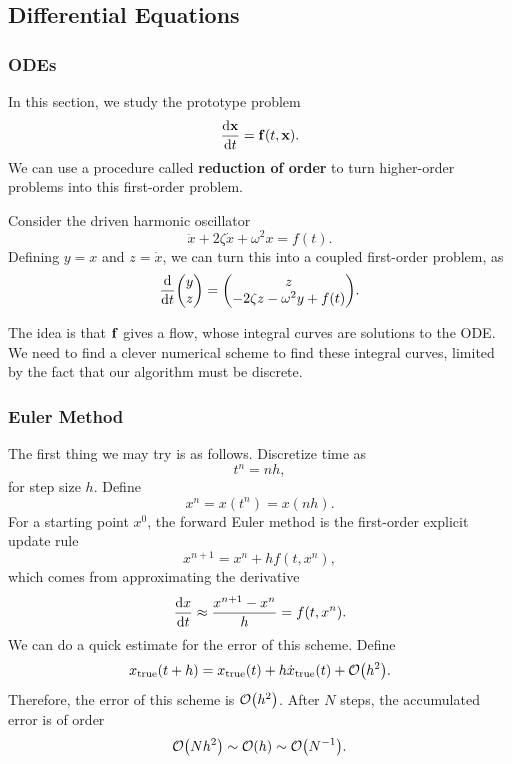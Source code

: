 \documentclass[12pt,letterpaper]{article}
\begin{document}
\subsection{Differential Equations}
\subsubsection{ODEs}
In this section, we study the prototype problem
\[\dv{\vb x}{t}=\vb f(t,\vb x).\]
We can use a procedure called \textbf{reduction of order} to turn higher-order problems into this first-order problem.
\begin{example}
    Consider the driven harmonic oscillator
    \[\ddot{x}+2\zeta\dot{x}+\omega^2x=f(t).\]
    Defining $y=x$ and $z=\dot x$, we can turn this into a coupled first-order problem, as
    \[\dv{t}\mqty(y\\z)=\mqty(z\\-2\zeta z-\omega^2y+f(t)).\]
\end{example}
The idea is that $\vb f$ gives a flow, whose integral curves are solutions to the ODE. We need to find a clever numerical scheme to find these integral curves, limited by the fact that our algorithm must be discrete.
\subsubsection{Euler Method}
The first thing we may try is as follows. Discretize time as
\[t^n=nh,\]
for step size $h$. Define
\[x^n=x(t^n)=x(nh).\]
For a starting point $x^0$, the forward Euler method is the first-order explicit update rule
\[x^{n+1}=x^n+hf(t,x^n),\]
which comes from approximating the derivative
\[\dv{x}{t}\approx\frac{x^{n+1}-x^n}{h}=f(t,x^n).\]
We can do a quick estimate for the error of this scheme. Define
\[x_{\text{true}}(t+h)=x_{\text{true}}(t)+h\dot x_{\text{true}}(t)+\order{h^2}.\]
Therefore, the error of this scheme is $\order{h^2}$. After $N$ steps, the accumulated error is of order
\[\order{Nh^2}\sim\order{h}\sim\order{N^{-1}}.\]
\end{document}
